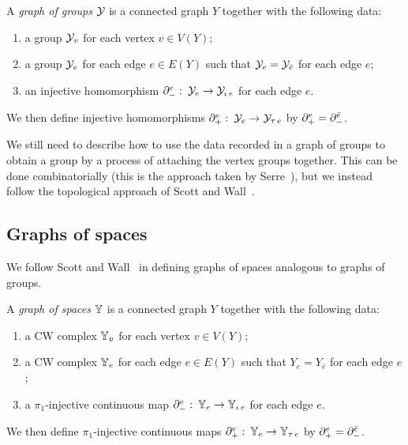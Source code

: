\begin{definition}\label{definition:graph_of_groups}

  A \emph{graph of groups} $\mathcal{Y}$ is a connected graph $Y$ together with the following data:
  \begin{enumerate}
    \item a group $\mathcal{Y}_v$ for each vertex $v \in V(Y)$;
    \item a group $\mathcal{Y}_e$ for each edge $e \in E(Y)$ such that $\mathcal{Y}_e = \mathcal{Y}_{\bar{e}}$ for each edge $e$;
    \item an injective homomorphism $\partial^e_{-} \operatorname{\colon} \mathcal{Y}_e \to \mathcal{Y}_{\operatorname{\iota} e}$ for each edge $e$.
  \end{enumerate}
  We then define injective homomorphisms $\partial^e_{+} \operatorname{\colon} \mathcal{Y}_e \to \mathcal{Y}_{\operatorname{\tau} e}$ by $\partial^e_{+} = \partial^{\bar{e}}_{-}$.

\end{definition}

We still need to describe how to use the data recorded in a graph of groups to obtain a group by a process of attaching the vertex groups together.
This can be done combinatorially (this is the approach taken by Serre~\cite{serre77}), but we instead follow the topological approach of Scott and Wall~\cite{scottwall80}.
  
\subsection{Graphs of spaces}

We follow Scott and Wall~\cite{scottwall80} in defining graphs of spaces analogous to graphs of groups.

\begin{definition}\label{definition:graph_of_spaces}

  A \emph{graph of spaces} $\mathbb{Y}$ is a connected graph $Y$ together with the following data:
  \begin{enumerate}
    \item a CW complex $\mathbb{Y}_v$ for each vertex $v \in V(Y)$;
    \item a CW complex $\mathbb{Y}_e$ for each edge $e \in E(Y)$ such that $Y_e = Y_{\bar{e}}$ for each edge $e$;
    \item a $\pi_1$-injective continuous map $\partial^e_{-}\operatorname{\colon} \mathbb{Y}_e \to \mathbb{Y}_{\operatorname{\iota} e}$ for each edge $e$.
  \end{enumerate}
  We then define $\pi_1$-injective continuous maps $\partial^e_{+}\operatorname{\colon} \mathbb{Y}_e \to \mathbb{Y}_{\operatorname{\tau} e}$ by $\partial^e_{+} = \partial^{\bar{e}}_{-}$.

\end{definition}

